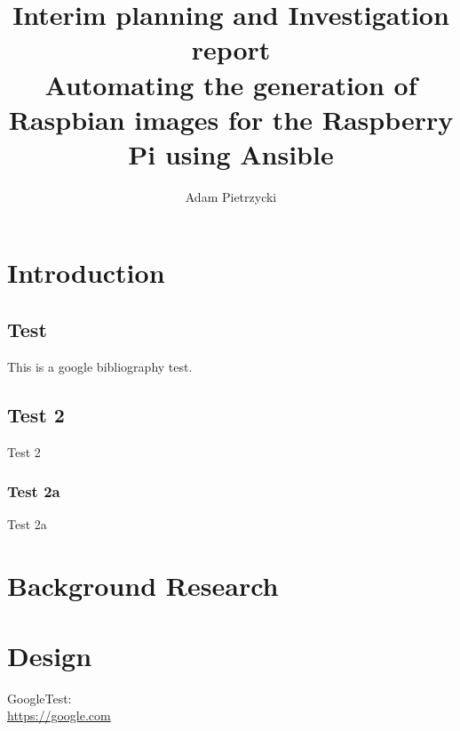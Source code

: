 \documentclass[10pt,a4paper]{report}
\title{\textbf{Interim planning and Investigation report} \\
			\large Automating the generation of Raspbian images for the Raspberry Pi using Ansible}
\author{Adam Pietrzycki}
\begin{document}
\maketitle
\pagebreak

\begin{abstract}

\end{abstract}

\pagebreak
\tableofcontents
\pagebreak

\chapter{Introduction}
\section{Test}
This is a google \cite{google} bibliography test.
\section{Test 2}
Test 2
\subsection{Test 2a}
Test 2a

\chapter{Background Research}

\chapter{Design}

\begin{thebibliography}{9}
GoogleTest:
\\\url{https://google.com}
\end{thebibliography}
\end{document}
